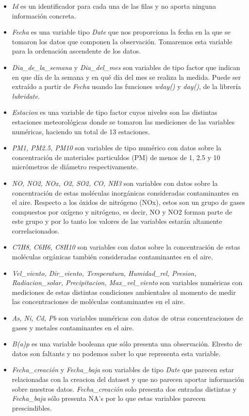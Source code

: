 \documentclass[notspecified,article,submit,moreauthors,pdftex]{Definitions/mdpi}
\begin{document}
\begin{itemize}
\item
  \emph{Id} es un identificador para cada una de las filas y no aporta
  ninguna información concreta.
\item
  \emph{Fecha} es una variable tipo \emph{Date} que nos proporciona la
  fecha en la que se tomaron los datos que componen la observación.
  Tomaremos esta variable para la ordenación ascendente de los datos.
\item
  \emph{Dia\_de\_la\_semana} y \emph{Dia\_del\_mes} son variables de
  tipo factor que indican en que día de la semana y en qué día del mes
  se realiza la medida. Puede ser extraído a partir de \emph{Fecha}
  usando las funciones \emph{wday()} y \emph{day()}, de la librería
  \emph{lubridate}.
\item
  \emph{Estacion} es una variable de tipo factor cuyos niveles son las
  distintas estaciones meteorológicas donde se tomaron las mediciones de
  las variables numéricas, haciendo un total de 13 estaciones.
\item
  \emph{PM1, PM2.5, PM10} son variables de tipo numérico con datos sobre
  la concentración de materiales particuldos (PM) de menos de 1, 2.5 y
  10 micrómetros de diámetro respectivamente.
\item
  \emph{NO, NO2, NOx, O2, SO2, CO, NH3} son variables con datos sobre la
  concentración de estas moléculas inorgánicas consideradas
  contaminantes en el aire. Respecto a los óxidos de nitrógeno (NOx),
  estos son un grupo de gases compuestos por oxígeno y nitrógeno, es
  decir, NO y NO2 forman parte de este grupo y por lo tanto los valores
  de las variables estarán altamente correlacionados.
\item
  \emph{C7H8, C6H6, C8H10} son variables con datos sobre la
  concentración de estas moléculas orgánicas también consideradas
  contaminantes en el aire.
\item
  \emph{Vel\_viento, Dir\_viento, Temperatura, Humidad\_rel, Presion,
  Radiacion\_solar, Precipitacion, Max\_vel\_viento} son variables
  numéricas con mediciones de estas distintas condiciones ambientales al
  momento de medir las concentraciones de moléculas contaminantes en el
  aire.
\item
  \emph{As, Ni, Cd, Pb} son variables numéricas con datos de otras
  concentraciones de gases y metales contaminantes en el aire.
\item
  \emph{B(a)p} es una variable booleana que sólo presenta una
  observación. Elresto de datos son faltants y no podemos saber lo que
  representa esta variable.
\item
  \emph{Fecha\_creación} y \emph{Fecha\_baja} son variables de tipo
  \emph{Date} que parecen estar relacionadas con la creacion del dataset
  y que no parecen aportar información sobre nuestros datos.
  \emph{Fecha\_creación} solo presenta dos entradas distintas y
  \emph{Fecha\_baja} sólo presenta NA's por lo que estas variables
  parecen prescindibles.
\end{itemize}
\end{document}
